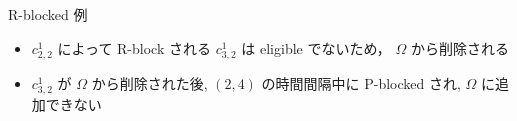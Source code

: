 \begin{frame}{}
\end{frame}

\begin{frame}{R-blocked 例}
\end{frame}

\begin{frame}{}
    \begin{itemize}
        \item $c_{2,2}^{1}$ によって R-block される $c_{3,2}^{1}$ は eligible でないため， $\Omega$ から削除される
        \item $c_{3,2}^{1}$ が $\Omega$ から削除された後, $(2,4)$ の時間間隔中に P-blocked され, $\Omega$ に追加できない
    \end{itemize}
\end{frame}
